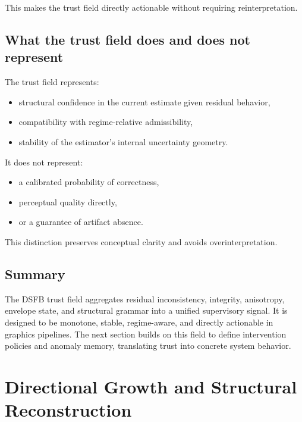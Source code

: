 \documentclass[11pt]{article}
\theoremstyle{definition}
\theoremstyle{plain}
\begin{document}
This makes the trust field directly actionable without requiring reinterpretation.


\subsection{What the trust field does and does not represent}

The trust field represents:
\begin{itemize}[leftmargin=1.5em]
    \item structural confidence in the current estimate given residual behavior,
    \item compatibility with regime-relative admissibility,
    \item stability of the estimator’s internal uncertainty geometry.
\end{itemize}

It does not represent:
\begin{itemize}[leftmargin=1.5em]
    \item a calibrated probability of correctness,
    \item perceptual quality directly,
    \item or a guarantee of artifact absence.
\end{itemize}

This distinction preserves conceptual clarity and avoids overinterpretation.


\subsection{Summary}

The DSFB trust field aggregates residual inconsistency, integrity, anisotropy, envelope state, and structural grammar into a unified supervisory signal. It is designed to be monotone, stable, regime-aware, and directly actionable in graphics pipelines. The next section builds on this field to define intervention policies and anomaly memory, translating trust into concrete system behavior.
\section{Directional Growth and Structural Reconstruction}
\end{document}
